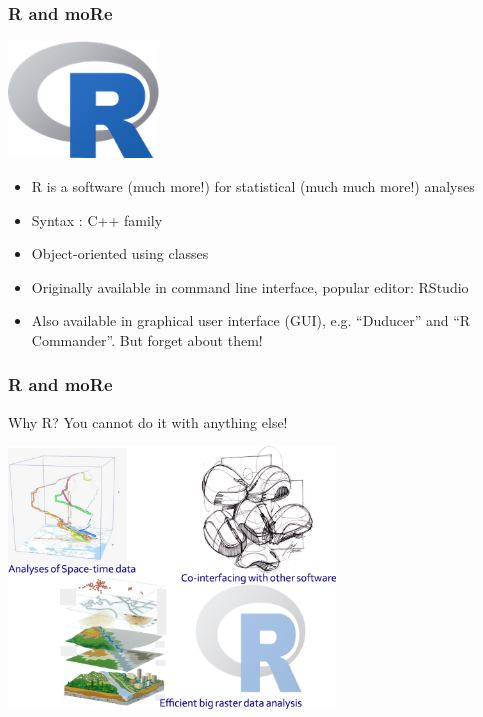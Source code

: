 \documentclass{beamer}
\begin{document}

\begin{frame}
\frametitle{R and moRe}
\centering
\includegraphics[width=0.3\textwidth]{Figures/Rlogo.png}
\pause
\begin{itemize}
\item R is a software (\alert{much more!}) for statistical (\alert{much much more!}) analyses
\pause
\item Syntax : C++ family
\pause
\item Object-oriented using classes
\pause
\item Originally available in command line interface, popular editor: \alert{RStudio}
\pause
\item Also available in graphical user interface (GUI), e.g. ``Duducer'' and ``R Commander''. \alert{But forget about them!}
\end{itemize}
\end{frame}


\begin{frame}
\frametitle{R and moRe}
\begin{block}{Why R?}
You cannot do it with anything else!
\end{block}
\pause
\centering
\includegraphics[width=0.65\textwidth]{Figures/R_adv.png}
\end{frame}

\end{document}
